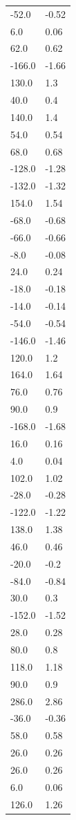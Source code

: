 \begin{longtable}{ll}
-52.0 & -0.52 \\
6.0 & 0.06 \\
62.0 & 0.62 \\
-166.0 & -1.66 \\
130.0 & 1.3 \\
40.0 & 0.4 \\
140.0 & 1.4 \\
54.0 & 0.54 \\
68.0 & 0.68 \\
-128.0 & -1.28 \\
-132.0 & -1.32 \\
154.0 & 1.54 \\
-68.0 & -0.68 \\
-66.0 & -0.66 \\
-8.0 & -0.08 \\
24.0 & 0.24 \\
-18.0 & -0.18 \\
-14.0 & -0.14 \\
-54.0 & -0.54 \\
-146.0 & -1.46 \\
120.0 & 1.2 \\
164.0 & 1.64 \\
76.0 & 0.76 \\
90.0 & 0.9 \\
-168.0 & -1.68 \\
16.0 & 0.16 \\
4.0 & 0.04 \\
102.0 & 1.02 \\
-28.0 & -0.28 \\
-122.0 & -1.22 \\
138.0 & 1.38 \\
46.0 & 0.46 \\
-20.0 & -0.2 \\
-84.0 & -0.84 \\
30.0 & 0.3 \\
-152.0 & -1.52 \\
28.0 & 0.28 \\
80.0 & 0.8 \\
118.0 & 1.18 \\
90.0 & 0.9 \\
286.0 & 2.86 \\
-36.0 & -0.36 \\
58.0 & 0.58 \\
26.0 & 0.26 \\
26.0 & 0.26 \\
6.0 & 0.06 \\
126.0 & 1.26 \\

\end{longtable}
